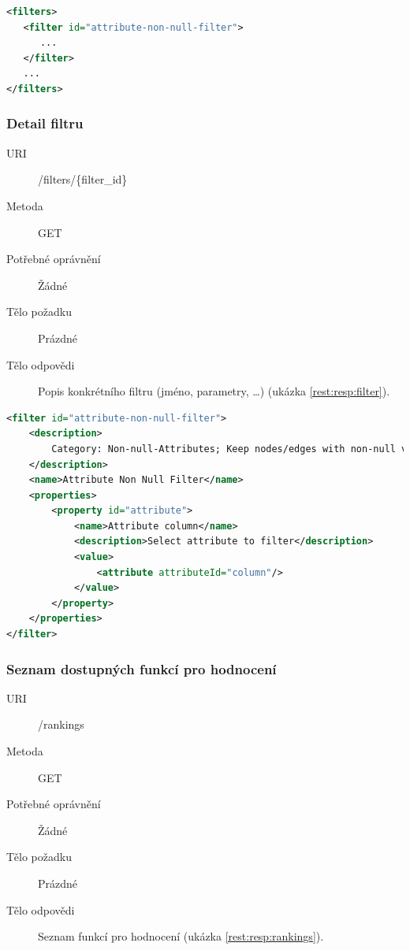 \documentclass[thesis=M,czech]{FITthesis}[2014/05/6]
\begin{document}
\begin{lstlisting}[caption=Tělo odpovědi zdroje /filters (GET), label=rest:resp:filters, language=xml]
<filters>
   <filter id="attribute-non-null-filter">
      ...
   </filter>
   ...
</filters>
\end{lstlisting}  

\subsubsection{Detail filtru}
\begin{description}
  \item[URI] /filters/\{filter\_id\}
  \item[Metoda] GET
  \item[Potřebné oprávnění] Žádné
  \item[Tělo požadku] Prázdné
  \item[Tělo odpovědi] Popis konkrétního filtru (jméno, parametry, \ldots) (ukázka \ref{rest:resp:filter}).
\end{description}

\begin{lstlisting}[caption=Tělo odpovědi zdroje /fiters/\{filter\_id\} (GET), label=rest:resp:filter, language=xml]
<filter id="attribute-non-null-filter">
    <description>
        Category: Non-null-Attributes; Keep nodes/edges with non-null values for a particular column
    </description>
    <name>Attribute Non Null Filter</name>
    <properties>
        <property id="attribute">
            <name>Attribute column</name>
            <description>Select attribute to filter</description>
            <value>
                <attribute attributeId="column"/>
            </value>
        </property>
    </properties>    
</filter>
\end{lstlisting}  

\subsubsection{Seznam dostupných funkcí pro hodnocení}
\begin{description}
  \item[URI] /rankings
  \item[Metoda] GET
  \item[Potřebné oprávnění] Žádné
  \item[Tělo požadku] Prázdné
  \item[Tělo odpovědi] Seznam funkcí pro hodnocení (ukázka \ref{rest:resp:rankings}).
\end{description}
\end{document}
